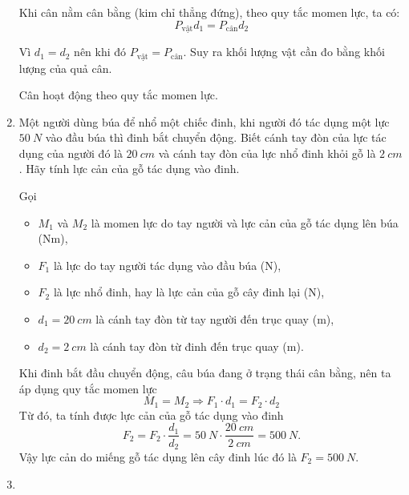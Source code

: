 \begin{enumerate}[label=\bfseries Câu \arabic*:]
	\loigiai
	{
		Khi cân nằm cân bằng (kim chỉ thẳng đứng), theo quy tắc momen lực, ta có:
		$$P_\text{vật} d_1 = P_\text{cân} d_2$$
		
		Vì $d_1=d_2$ nên khi đó $P_\text{vật} = P_\text{cân}$. Suy ra khối lượng vật cần đo bằng khối lượng của quả cân.
		
	Cân hoạt động theo quy tắc momen lực.
	}
	\item {}
	
	\cauhoi
	{Một người dùng búa để nhổ một chiếc đinh, khi người đó tác dụng một lực $\SI{50}{N}$ vào đầu búa thì đinh bắt chuyển động. Biết cánh tay đòn của lực tác dụng của người đó là $\SI{20}{cm}$ và cánh tay đòn của lực nhổ đinh khỏi gỗ là $\SI{2}{cm}$. Hãy tính lực cản của gỗ tác dụng vào đinh.
	}
	
	\loigiai
	{Gọi 
		\begin{itemize}
			\item $M_1$ và $M_2$ là momen lực do tay người và lực cản của gỗ tác dụng lên búa ($\textrm{Nm}$),
			\item $F_1$ là lực do tay người tác dụng vào đầu búa ($\textrm{N}$),
			\item $F_2$ là lực nhổ đinh, hay là lực cản của gỗ cây đinh lại ($\textrm{N}$), 
			\item  $d_1=\SI{20}{cm}$ là cánh tay đòn từ tay người đến trục quay ($\textrm{m}$), 
			\item  $d_2=\SI{2}{cm}$ là cánh tay đòn từ đinh đến trục quay ($\textrm{m}$). 
		\end{itemize}
		
		Khi đinh bắt đầu chuyển động, câu búa đang ở trạng thái cân bằng, nên ta áp dụng quy tắc momen lực
		\begin{equation*}
			M_1=M_2 \Rightarrow F_1\cdot d_1 = F_2\cdot d_2
		\end{equation*}
		Từ đó, ta tính được lực cản của gỗ tác dụng vào đinh 
		\begin{equation*}
			F_2=F_2\cdot \dfrac{d_1}{d_2}
			=
			\SI{50}{N}\cdot \dfrac{\SI{20}{cm}}{\SI{2}{cm}}
			=
			\SI{500}{N}.
		\end{equation*}
		Vậy lực cản do miếng gỗ tác dụng lên cây đinh lúc đó là $F_2=\SI{500}{N}$.
	}
	\item {}
	

\end{enumerate}
